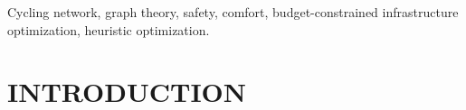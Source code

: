\documentclass[lettersize,journal]{IEEEtran}
\begin{document}
\begin{IEEEkeywords}
Cycling network, graph theory,  safety, comfort, budget-constrained infrastructure optimization, heuristic optimization.
\end{IEEEkeywords}

\section{INTRODUCTION}


\end{document}
